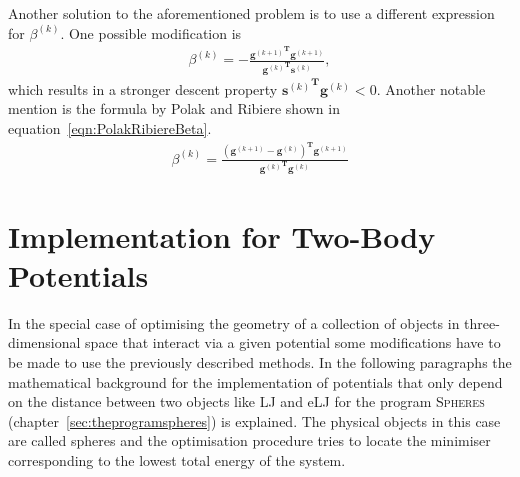 Another solution to the aforementioned problem is to use a different expression
for $\beta^{(k)}$. One possible modification is
%
\begin{align}
    \beta^{(k)}=-\frac{{\mathbf{g}^{(k+1)}}^\mathbf{T}\mathbf{g}^{(k+1)}}{{\mathbf{g}^{(k)}}^\mathbf{T}\mathbf{s}^{(k)}}\label{eqn:DescentBeta},
\end{align}
%
which results in a stronger descent property
${\mathbf{s}^{(k)}}^\mathbf{T}\mathbf{g}^{(k)} < 0$. Another notable mention is
the formula by Polak and
Ribiere\autocite{Polak_ComputationalMethodsOptimization_1971} shown in
equation~\eqref{eqn:PolakRibiereBeta}.
%
\begin{align}
    \beta^{(k)}=\frac{\left(\mathbf{g}^{(k+1)}-\mathbf{g}^{(k)}\right)^\mathbf{T}\mathbf{g}^{(k+1)}}{{\mathbf{g}^{(k)}}^\mathbf{T}\mathbf{g}^{(k)}}\label{eqn:PolakRibiereBeta}
\end{align}

\section{Implementation for Two-Body Potentials}
\label{sec:PracticalImplementationForPotentialsDependingOnPairDistances}

In the special case of optimising the geometry of a collection of objects in
three-dimensional space that interact via a given potential some modifications
have to be made to use the previously described methods. In the following
paragraphs the mathematical background for the implementation of potentials
that only depend on the distance between two objects like \ac{LJ} and \ac{eLJ}
for the program \textsc{Spheres} (chapter~\ref{sec:theprogramspheres}) is
explained. The physical objects in this case are called spheres and the
optimisation procedure tries to locate the minimiser corresponding to the
lowest total energy of the system.

